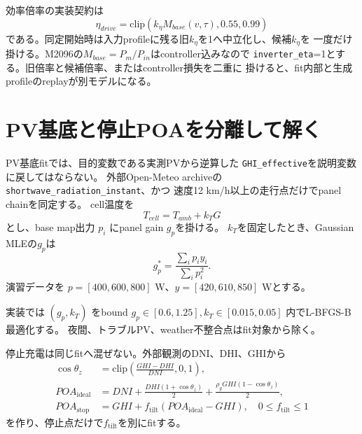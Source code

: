 効率倍率の実装契約は
\[
 \eta_{drive}=\mathrm{clip}(k_\eta M_{base}(v,\tau),0.55,0.99)
\]
である。同定開始時は入力profileに残る旧$k_\eta$を1へ中立化し、候補$k_\eta$を
一度だけ掛ける。M2096の$M_{base}=P_m/P_{in}$はcontroller込みなので
\texttt{inverter\_eta}=1とする。旧倍率と候補倍率、またはcontroller損失を二重に
掛けると、fit内部と生成profileのreplayが別モデルになる。



\section{PV基底と停止POAを分離して解く}
PV基底fitでは、目的変数である実測PVから逆算した
\texttt{GHI\_effective}を説明変数に戻してはならない。
外部Open-Meteo archiveの\texttt{shortwave\_radiation\_instant}、かつ
速度12 km/h以上の走行点だけでpanel chainを同定する。
cell温度を
\[
T_{cell}=T_{amb}+k_TG
\]
とし、base map出力 $p_i$ にpanel gain $g_p$を掛ける。
$k_T$を固定したとき、Gaussian MLEの$g_p$は
\[
g_p^*=\frac{\sum_i p_i y_i}{\sum_i p_i^2}.
\]
演習データを $p=[400,600,800]$ W、$y=[420,610,850]$ Wとする。


実装では $(g_p,k_T)$ をbound
$g_p\in[0.6,1.25],k_T\in[0.015,0.05]$ 内でL-BFGS-B最適化する。
夜間、トラブルPV、weather不整合点はfit対象から除く。

停止充電は同じfitへ混ぜない。外部観測のDNI、DHI、GHIから
\[
\begin{split}
\cos\theta_z&=\mathrm{clip}\left(\frac{GHI-DHI}{DNI},0,1\right),\\
POA_{\mathrm{ideal}}&=DNI+
\frac{DHI(1+\cos\theta_z)}{2}+
\frac{\rho_gGHI(1-\cos\theta_z)}{2},\\
POA_{\mathrm{stop}}&=GHI+
f_{\mathrm{tilt}}(POA_{\mathrm{ideal}}-GHI),\quad
0\le f_{\mathrm{tilt}}\le1
\end{split}
\]
を作り、停止点だけで$f_{\mathrm{tilt}}$を別にfitする。


